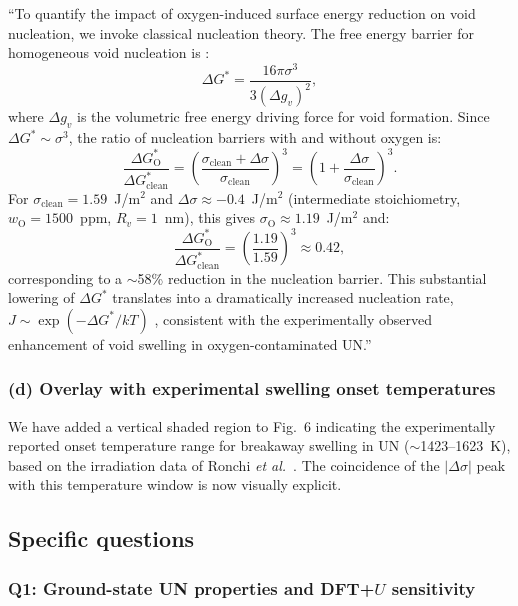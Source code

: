 \documentclass[12pt]{article}
\begin{document}
``To quantify the impact of oxygen-induced surface energy reduction on void nucleation, we invoke classical nucleation theory. The free energy barrier for homogeneous void nucleation is \cite{Fultz2020}:
\begin{equation}
\Delta G^* = \frac{16 \pi \sigma^3}{3 (\Delta g_v)^2},
\end{equation}
where $\Delta g_v$ is the volumetric free energy driving force for void formation. Since $\Delta G^* \sim \sigma^3$, the ratio of nucleation barriers with and without oxygen is:
\begin{equation}
\frac{\Delta G^*_\text{O}}{\Delta G^*_\text{clean}} = \left( \frac{\sigma_\text{clean} + \Delta \sigma}{\sigma_\text{clean}} \right)^3 = \left( 1 + \frac{\Delta \sigma}{\sigma_\text{clean}} \right)^3.
\end{equation}
For $\sigma_\text{clean} = 1.59$~J/m$^2$ and $\Delta \sigma \approx -0.4$~J/m$^2$ (intermediate stoichiometry, $w_\text{O} = 1500$~ppm, $R_v = 1$~nm), this gives $\sigma_\text{O} \approx 1.19$~J/m$^2$ and:
\begin{equation}
\frac{\Delta G^*_\text{O}}{\Delta G^*_\text{clean}} = \left( \frac{1.19}{1.59} \right)^3 \approx 0.42,
\end{equation}
corresponding to a $\sim$58\% reduction in the nucleation barrier. This substantial lowering of $\Delta G^*$ translates into a dramatically increased nucleation rate, $J \sim \exp(-\Delta G^*/kT)$ \cite{Fultz2020}, consistent with the experimentally observed enhancement of void swelling in oxygen-contaminated UN.''

\color{black}

\subsubsection*{(d) Overlay with experimental swelling onset temperatures}

We have added a vertical shaded region to Fig.~6 indicating the experimentally reported onset temperature range for breakaway swelling in UN ($\sim$1423--1623~K), based on the irradiation data of Ronchi \textit{et al.}~\cite{Ronchi1978}. The coincidence of the $|\Delta \sigma|$ peak with this temperature window is now visually explicit.

\subsection*{Specific questions}

\subsubsection*{Q1: Ground-state UN properties and DFT+$U$ sensitivity}
\end{document}
